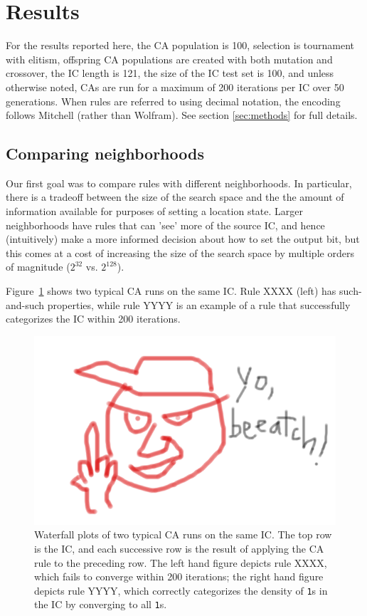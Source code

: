 \section{Results} \label{results}

For the results reported here, the CA population is 100, selection is tournament with elitism, offspring CA populations are created with both 
mutation and crossover, the IC length is 121, the size of the IC test set is 100, and unless otherwise noted, CAs are run for a maximum of 
200 iterations per IC over 50 generations. When rules are referred to using decimal notation, the encoding follows Mitchell 
\cite{Mitchell:1994:ECA:186092.186116} (rather than Wolfram). See section \ref{sec:methods} 
for full details.

\subsection{Comparing neighborhoods} \label{sec:2_1}
Our first goal was to compare rules with different neighborhoods. In particular, there is a tradeoff between the size of the search space and the 
the amount of information available for purposes of setting a location state. Larger neighborhoods have rules that can 'see' more of the source IC, and 
hence (intuitively) make a more informed decision about how to set the output bit, but this comes at a cost of increasing the size of the search space by multiple 
orders of magnitude ($2^{32}$ vs. $2^{128}$).

Figure~\ref{fig:waterfall} shows two typical CA runs on the same IC. Rule XXXX (left) has such-and-such properties, while rule YYYY is an example of a rule that successfully categorizes the IC within 200 iterations.
\begin{figure}
\begin{center}
\includegraphics[width=\linewidth]{foo.png}
\caption{Waterfall plots of two typical CA runs on the same IC. The top row is the IC, and each successive row is the result of applying the CA rule 
to the preceding row. The left hand figure depicts rule XXXX, which fails to converge within 200 iterations; the right hand figure depicts rule YYYY, 
which correctly categorizes the density of \texttt{1}s in the IC by converging to all \texttt{1}s.}
\label{fig:waterfall}
\end{center}
\end{figure}

